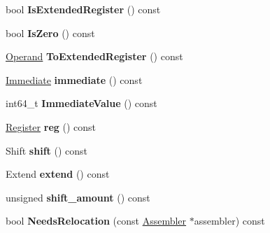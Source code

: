 \begin{DoxyCompactItemize}
\item 
bool {\bfseries Is\+Extended\+Register} () const \hypertarget{classv8_1_1internal_1_1_operand_ac156063198843984ab9e82807593053c}{}\label{classv8_1_1internal_1_1_operand_ac156063198843984ab9e82807593053c}

\item 
bool {\bfseries Is\+Zero} () const \hypertarget{classv8_1_1internal_1_1_operand_a6bbd32d8cab8a5f1968179b75a7d5834}{}\label{classv8_1_1internal_1_1_operand_a6bbd32d8cab8a5f1968179b75a7d5834}

\item 
\hyperlink{classv8_1_1internal_1_1_operand}{Operand} {\bfseries To\+Extended\+Register} () const \hypertarget{classv8_1_1internal_1_1_operand_ad26bda496fd7c85ebba29750d64a1de6}{}\label{classv8_1_1internal_1_1_operand_ad26bda496fd7c85ebba29750d64a1de6}

\item 
\hyperlink{classv8_1_1internal_1_1_immediate}{Immediate} {\bfseries immediate} () const \hypertarget{classv8_1_1internal_1_1_operand_acdb30bf987f88fe1b8d1417a56b13410}{}\label{classv8_1_1internal_1_1_operand_acdb30bf987f88fe1b8d1417a56b13410}

\item 
int64\+\_\+t {\bfseries Immediate\+Value} () const \hypertarget{classv8_1_1internal_1_1_operand_a8ff705e2bfdb3dcd82992bb24baad460}{}\label{classv8_1_1internal_1_1_operand_a8ff705e2bfdb3dcd82992bb24baad460}

\item 
\hyperlink{structv8_1_1internal_1_1_register}{Register} {\bfseries reg} () const \hypertarget{classv8_1_1internal_1_1_operand_af54b7d635facfccbbdd783b5e2825a57}{}\label{classv8_1_1internal_1_1_operand_af54b7d635facfccbbdd783b5e2825a57}

\item 
Shift {\bfseries shift} () const \hypertarget{classv8_1_1internal_1_1_operand_ab0a60b8ae944c71381a382759d837363}{}\label{classv8_1_1internal_1_1_operand_ab0a60b8ae944c71381a382759d837363}

\item 
Extend {\bfseries extend} () const \hypertarget{classv8_1_1internal_1_1_operand_aff6f827bc8e3135dc2f7393337ba9e7b}{}\label{classv8_1_1internal_1_1_operand_aff6f827bc8e3135dc2f7393337ba9e7b}

\item 
unsigned {\bfseries shift\+\_\+amount} () const \hypertarget{classv8_1_1internal_1_1_operand_a71b41dc56129ebd882da6aef4d0f1aec}{}\label{classv8_1_1internal_1_1_operand_a71b41dc56129ebd882da6aef4d0f1aec}

\item 
bool {\bfseries Needs\+Relocation} (const \hyperlink{classv8_1_1internal_1_1_assembler}{Assembler} $\ast$assembler) const \hypertarget{classv8_1_1internal_1_1_operand_aa7369eb98799fec3549e7a83345e1dd4}{}\label{classv8_1_1internal_1_1_operand_aa7369eb98799fec3549e7a83345e1dd4}

\end{DoxyCompactItemize}

